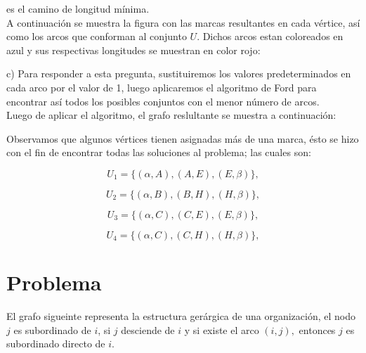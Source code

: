 \documentclass[autocontact]{gaceta}
\begin{document}
    es el camino de longitud mínima.\\ A continuación se muestra la figura con las marcas resultantes 
    en cada vértice, así como los arcos que conforman 
    al conjunto $U$. Dichos arcos estan coloreados en azul y sus respectivas longitudes se muestran en 
    color rojo:

    

    c) Para responder a esta pregunta, sustituiremos los valores predeterminados en cada 
    arco por el valor de 1, luego aplicaremos el algoritmo de Ford para encontrar así 
    todos los posibles conjuntos con el menor número de arcos.
    \\Luego de aplicar el algoritmo, el grafo reslultante se muestra a continuación:

    \pagebreak

    
    Observamos que algunos vértices tienen asignadas más de una marca, ésto se hizo con el fin de 
    encontrar todas las soluciones al problema; las cuales son:
    \begin{center}
       \begin{equation}
            U_1 = \{(\alpha,A), (A,E), (E,\beta)\},              
       \end{equation}
       
       \begin{equation}
            U_2 = \{(\alpha,B), (B,H), (H,\beta)\},
       \end{equation}

       \begin{equation}
            U_3 = \{(\alpha,C), (C,E), (E,\beta)\},
       \end{equation}

       \begin{equation}
            U_4 = \{(\alpha,C), (C,H), (H,\beta)\},
       \end{equation}

    \end{center}
    


\section{Problema}
    El grafo sigueinte representa la estructura gerárgica de una organización, el nodo 
    $j$ es subordinado de $i$, si $j$ desciende de $i$ y si existe el arco $(i,j),$ entonces
    $j$ es subordinado directo de $i$.
    
\end{document}
